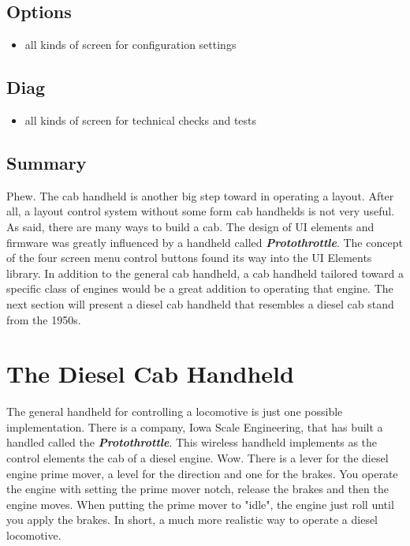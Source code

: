 \subsection{Options}

\begin{itemize}
\item all kinds of screen for configuration settings
\end{itemize}

\subsection{Diag}

\begin{itemize}
\item all kinds of screen for technical checks and tests
\end{itemize}

\subsection{Summary}

Phew. The cab handheld is another big step toward in operating a layout. After all, a layout control system without some form cab handhelds is not very useful. As said, there are many ways to build a cab. The design of UI elements and firmware was greatly influenced by a handheld called \textbf{\textit{Protothrottle}}. The concept of the four screen menu control buttons found its way into the UI Elements library. In addition to the general cab handheld, a cab handheld tailored toward a specific class of engines would be a great addition to operating that engine. The next section will present a diesel cab handheld that resembles a diesel cab stand from the 1950s.

\section{The Diesel Cab Handheld}

The general handheld for controlling a locomotive is just one possible implementation. There is a company, Iowa Scale Engineering, that has built a handled called the \textbf{\textit{Protothrottle}}. This wireless handheld implements as the control elements the cab of a diesel engine. Wow. There is a lever for the diesel engine prime mover, a level for the direction and one for the brakes. You operate the engine with setting the prime mover notch, release the brakes and then the engine moves. When putting the prime mover to "idle", the engine just roll until you apply the brakes. In short, a much more realistic way to operate a diesel locomotive. 

